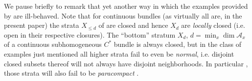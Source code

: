 \documentclass[11pt,leqno]{article}
\theoremstyle{plain}
\theoremstyle{plain}
\theoremstyle{plain}
\numberwithin{equation}{section}
\theoremstyle{nonumberplain}
\newcommand\cA{{\mathcal A}}
\newcommand\1{{\bf 1}}
\begin{document}
We pause briefly to remark that yet another way in which the examples provided by  are ill-behaved. Note that for continuous bundles (as virtually all are, in the present paper) the strata $X_{\le d}$ of  are closed \cite[Theorem 18.3]{gierz_bdls} and hence $X_d$ are {\it locally} closed (i.e. \cite[\S I.3.3]{bourb_top_en_1} open in their respective closures). The ``bottom'' stratum $X_d$, $d=\min_x\dim \cA_x$ of a continuous subhomogeneous $C^*$ bundle is always closed, but in the class of examples just mentioned all higher strata fail to even be {\it normal}, i.e. \cite[Definition 15.1]{wil_top} disjoint closed subsets thereof will not always have disjoint neighborhoods. In particular \cite[Theorem 20.10]{wil_top}, those strata will also fail to be {\it paracompact} \cite[Definition 20.6]{wil_top}.
\end{document}
